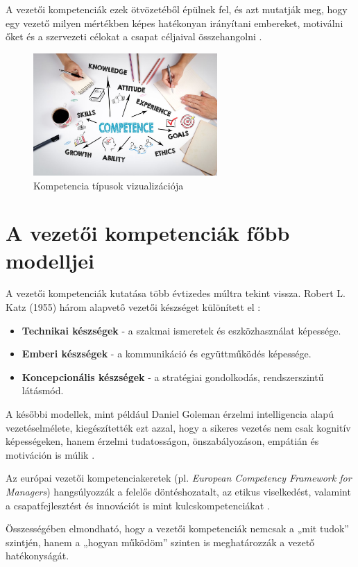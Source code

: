 A vezetői kompetenciák ezek ötvözetéből épülnek fel, és azt mutatják meg, hogy egy vezető milyen mértékben képes hatékonyan irányítani embereket, motiválni őket és a szervezeti célokat a csapat céljaival összehangolni \cite{boyatzis1982}.
\begin{figure}[H]
	\centering
    \includegraphics[width=70mm, keepaspectratio]{figures/competence.jpg}
    \caption{Kompetencia típusok vizualizációja} 
    \label {fig:competence}
\end{figure}
\section{A vezetői kompetenciák főbb modelljei}

A vezetői kompetenciák kutatása több évtizedes múltra tekint vissza. 
Robert L. Katz (1955) három alapvető vezetői készséget különített el \cite{katz1955}:

\begin{itemize}
    \item \textbf{Technikai készségek} - a szakmai ismeretek és eszközhasználat képessége.
    \item \textbf{Emberi készségek} - a kommunikáció és együttműködés képessége.
    \item \textbf{Koncepcionális készségek} - a stratégiai gondolkodás, rendszerszintű látásmód.
\end{itemize}

A későbbi modellek, mint például Daniel Goleman érzelmi intelligencia alapú vezetéselmélete, 
kiegészítették ezt azzal, hogy a sikeres vezetés nem csak kognitív képességeken, 
hanem érzelmi tudatosságon, önszabályozáson, empátián és motiváción is múlik \cite{goleman1998}. 

Az európai vezetői kompetenciakeretek (pl. \textit{European Competency Framework for Managers}) 
hangsúlyozzák a felelős döntéshozatalt, az etikus viselkedést, valamint a csapatfejlesztést és innovációt is mint kulcskompetenciákat \cite{ecfm2010}.

Összességében elmondható, hogy a vezetői kompetenciák nemcsak a „mit tudok” szintjén, 
hanem a „hogyan működöm” szinten is meghatározzák a vezető hatékonyságát. 